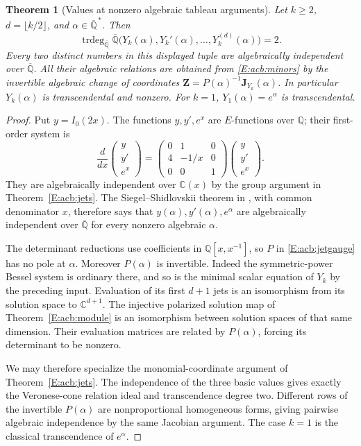 \documentclass[11pt,a4paper]{article}
\newtheorem{theorem}{Theorem}[section]
\theoremstyle{definition}
\theoremstyle{remark}
\numberwithin{equation}{section}
\begin{document}
\begin{theorem}[Values at nonzero algebraic tableau arguments]
\label{E:acb:values}
Let $k\ge2$, $d=\lfloor k/2\rfloor$, and
$\alpha\in\overline{\mathbb Q}^{\,*}$.
Then
\[
 \operatorname{trdeg}_{\overline{\mathbb Q}}
 \overline{\mathbb Q}\bigl(Y_k(\alpha),Y_k'(\alpha),\ldots,
                                Y_k^{(d)}(\alpha)\bigr)=2.
\]
Every two distinct numbers in this displayed tuple are
algebraically independent over $\overline{\mathbb Q}$.
All their algebraic relations are obtained from
\eqref{E:acb:minors} by the invertible algebraic change of
coordinates $\mathbf Z=P(\alpha)^{-1}\mathbf J_{Y_k}(\alpha)$.
In particular $Y_k(\alpha)$ is transcendental and nonzero.
For $k=1$, $Y_1(\alpha)=e^\alpha$ is transcendental.
\end{theorem}

\begin{proof}
Put $y=I_0(2x)$.  The functions $y,y',e^x$ are $E$-functions
over $\mathbb Q$; their first-order system is
\[
 \frac{d}{dx}
 \begin{pmatrix}y\\y'\\e^x\end{pmatrix}
 =\begin{pmatrix}0&1&0\\4&-1/x&0\\0&0&1\end{pmatrix}
 \begin{pmatrix}y\\y'\\e^x\end{pmatrix}.
\]
They are algebraically independent over $\mathbb C(x)$ by
the group argument in Theorem~\ref{E:acb:jets}.
The Siegel--Shidlovskii theorem in
\cite[Theorem~1.1]{BVBeukers2006}, with common denominator $x$,
therefore says that $y(\alpha),y'(\alpha),e^\alpha$ are
algebraically independent over $\overline{\mathbb Q}$ for every
nonzero algebraic $\alpha$.

The determinant reductions use coefficients in
$\mathbb Q[x,x^{-1}]$, so $P$ in \eqref{E:acb:jetgauge} has no
pole at $\alpha$.  Moreover $P(\alpha)$ is invertible.
Indeed the symmetric-power Bessel system is ordinary there,
and so is the minimal scalar equation of $Y_k$ by the preceding
input.  Evaluation of its first $d+1$ jets is an isomorphism
from its solution space to $\mathbb C^{d+1}$.  The injective
polarized solution map of Theorem~\ref{E:acb:module} is an
isomorphism between solution spaces of that same dimension.
Their evaluation matrices are related by $P(\alpha)$, forcing
its determinant to be nonzero.

We may therefore specialize the monomial-coordinate argument
of Theorem~\ref{E:acb:jets}.  The independence of the three basic
values gives exactly the Veronese-cone relation ideal and
transcendence degree two.  Different rows of the invertible
$P(\alpha)$ are nonproportional homogeneous forms, giving
pairwise algebraic independence by the same Jacobian argument.
The case $k=1$ is the classical transcendence of $e^\alpha$.
\end{proof}
\end{document}
